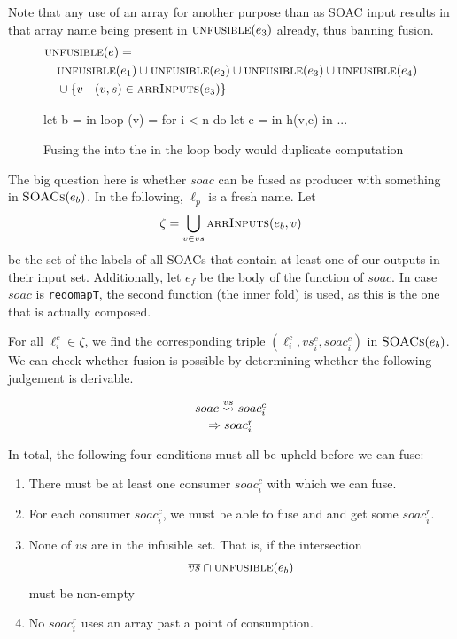 \begin{description}[style=nextline]
  Note that any use of an array for another purpose than as SOAC input
  results in that array name being present in $\textsc{unfusible}(e_{3})$
  already, thus banning fusion.
\begin{align*}
  & \textsc{unfusible}(e) =\\
  & \quad \textsc{unfusible}(e_{1}) \cup \textsc{unfusible}(e_{2}) \cup \textsc{unfusible}(e_{3}) \cup \textsc{unfusible}(e_{4}) \\
  & \quad \cup \{ v\ |\ (v,s) \in \textsc{arrInputs}(e_{3}) \}
\end{align*}

\begin{figure}
\begin{center}
\begin{bcolorcode}
let b =  in
loop (v) = for i < n do
             let c =  in
             h(v,c) in
...
\end{bcolorcode}
\end{center}
\caption{Fusing the  into the  in the loop body would duplicate computation}
\label{fig:cannot-fuse-loop}
\end{figure}

\item[Case $e \equiv \texttt{let \{$\overline{vs}$\} = $soac$ in $e_{b}$}$]

  The big question here is whether $soac$ can be fused as producer
  with something in $\textsc{SOACs}(e_{b})$.  In the following, $\ell_{p}$ is
  a fresh name.  Let
  \[
  \zeta = \bigcup_{v \in vs} \textsc{arrInputs}(e_{b},v)
  \]
  be the set of the labels of all SOACs that contain at least one of
  our outputs in their input set.  Additionally, let $e_{f}$ be the
  body of the function of $soac$.  In case $soac$ is
  \texttt{redomapT}, the second function (the inner fold) is used, as
  this is the one that is actually composed.

  For all $\ell^{c}_{i} \in \zeta$, we find the corresponding triple
  $(\ell^{c}_{i},vs^{c}_{i},soac^{c}_{i})$ in $\textsc{SOACs}(e_{b})$.  We can check
  whether fusion is possible by determining whether the following
  judgement is derivable.

\[
   \fusesto
    {vs}
    {soac}
    {soac^{c}_{i}}
    {soac^{r}_{i}}
\]

In total, the following four conditions must all be upheld before we
can fuse:

\begin{enumerate}
\item There must be at least one consumer $soac^{c}_{i}$ with which we can fuse.
\item For each consumer $soac^{c}_{i}$, we must be able to fuse and
  and get some $soac^{r}_{i}$.
\item None of $\overline{vs}$ are in the infusible set.  That is, if the intersection
\[
\overline{vs} \cap \textsc{unfusible}(e_{b})
\]
must be non-empty
\item No $soac^{r}_{i}$ uses an array past a point of consumption. 
\end{enumerate}


\end{description}
